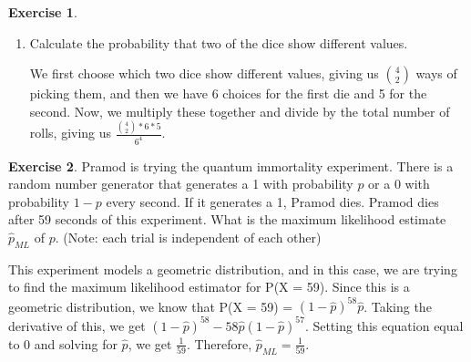 \documentclass[12pt]{amsart}
\theoremstyle{definition}
\newtheorem{exercise}{Exercise}
\numberwithin{equation}{section}
\theoremstyle{plain}
\begin{document}
\begin{exercise}
\begin{enumerate}[label=\Alph*.)]
\begin{answer}
\end{answer}
\item Calculate the probability that two of the dice show different values.
\begin{answer}
We first choose which two dice show different values, giving us $\binom{4}{2}$ ways of picking them, and then we have 6 choices for the first die and 5 for the second. Now, we multiply these together and divide by the total number of rolls, giving us $\frac{\binom{4}{2}*6*5}{6^4}$.
\end{answer}
\end{enumerate}
\end{exercise}

 

\begin{exercise}
    Pramod is trying the quantum immortality experiment. There is a random number generator that generates a 1 with probability $p$ or a 0 with probability $1-p$ every second. If it generates a 1, Pramod dies. Pramod dies after 59 seconds of this experiment. What is the maximum likelihood estimate $\hat{p}_{ML}$ of $p$. (Note: each trial is independent of each other)
    \begin{answer}
    This experiment models a geometric distribution, and in this case, we are trying to find the maximum likelihood estimator for P(X = 59). Since this is a geometric distribution, we know that P(X = 59) = $(1-\hat{p})^{58}\hat{p}$. Taking the derivative of this, we get $(1-\hat{p})^{58} - 58\hat{p}(1-\hat{p})^{57}$. Setting this equation equal to 0 and solving for $\hat{p}$, we get $\frac{1}{59}$. Therefore, $\hat{p}_{ML} = \frac{1}{59}$.
    \end{answer}
\end{exercise}

 
\end{document}
